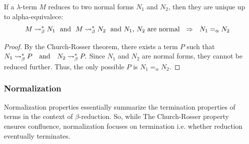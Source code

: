 

\begin{corollary}
\label{cor:unique-normal-form}
If a $\lambda$-term $M$ reduces to two normal forms $N_1$ and $N_2$, then they are unique up to alpha-equivalece:
\[
M \mathrel{\leadsto}_\beta^* N_1 \ \ \text{and} \ \ M \mathrel{\leadsto}_\beta^* N_2 \ \ \text{and $N_1$, $N_2$ are normal} \ \ \Rightarrow \ \ N_1 =_\alpha N_2
\]
\end{corollary}

\begin{proof}[Proof]
By the Church-Rosser theorem, there exists a term \( P \) such that
\(
N_1 \mathrel{\leadsto}_\beta^{*} P \quad \text{and} \quad N_2 \mathrel{\leadsto}_\beta^{*} P.
\)
Since \( N_1 \) and \( N_2 \) are normal forms, they cannot be reduced further.  
Thus, the only possible \( P \) is \( N_1 =_\alpha N_2 \).
\end{proof}


\subsubsection{\centering Normalization}

\label{sec:normalization}
Normalization properties essentially summarize the termination properties of terms in the context of $\beta$-reduction. So, while The Church-Rosser property ensures confluence, normalization focuses on termination i.e. whether reduction eventually terminates.

